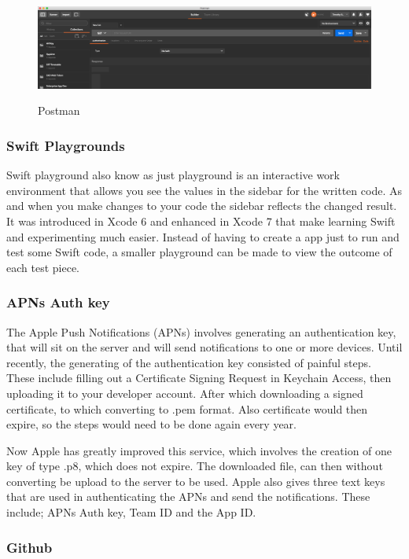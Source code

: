 \begin{figure}[!h]
    \caption{Postman}
    \centering
    \includegraphics[width=150mm]{images/postman}
    \label{fig:postman}
\end{figure}


\subsubsection{Swift Playgrounds}

Swift playground also know as just playground is an interactive work environment that allows you see the values in the sidebar for the written code. As and when you make changes to your code the sidebar reflects the changed result. It was introduced in Xcode 6 and enhanced in Xcode 7 that make learning Swift and experimenting much easier. Instead of having to create a app just to run and test some Swift code, a smaller playground can be made to view the outcome of each test piece. 

\subsubsection{APNs Auth key}

The Apple Push Notifications (APNs) involves generating an authentication key, that will sit on the server and will send notifications to one or more devices. Until recently, the generating of the authentication key consisted of painful steps. These include filling out a Certificate Signing Request in Keychain Access, then uploading it to your developer account. After which downloading a signed certificate, to which converting to .pem format. Also certificate would then expire, so the steps would need to be done again every year.

Now Apple has greatly improved this service, which involves the creation of one key of type .p8, which does not expire. The downloaded file, can then without converting be upload to the server to be used. Apple also gives three text keys that are used in authenticating the APNs and send the notifications. These include; APNs Auth key, Team ID and the App ID.

\subsubsection{Github}

